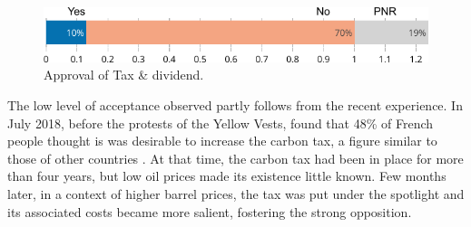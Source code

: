 \documentclass[english,5p,authoryear]{elsarticle}
\begin{document}

\begin{figure}[t]
\centering
\includegraphics[width=\columnwidth]{Images/approval_trim.png}
\caption{Approval of Tax \& dividend.}
\label{fig:approval}
\end{figure}


The low level of acceptance observed partly follows from the recent experience. In July 2018, before the protests of the Yellow Vests, \citet{ademe_representations_2018} found that 48\% of French people thought is was desirable to increase the carbon tax, a figure similar to those of other countries \citep{brechin_public_2010}. At that time, the carbon tax had been in place for more than four years, but low oil prices made its existence little known. Few months later, in a context of higher barrel prices, the tax was put under the spotlight and its associated costs became more salient, fostering the strong opposition.

\end{document}
